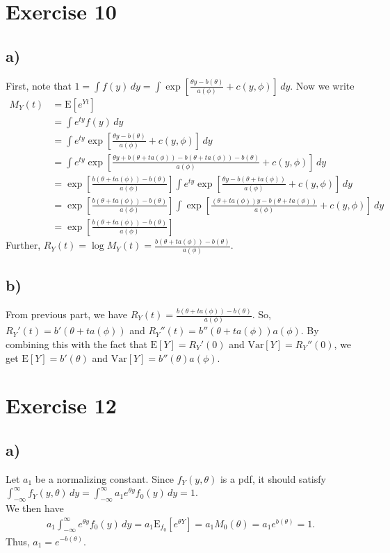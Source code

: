 \documentclass[a4paper]{article}
\newcommand{\E}{\mathrm{E}}
\newcommand{\Var}{\mathrm{Var}}
\begin{document}
\vspace{\baselineskip}
\section{Exercise 10}

\subsection{a)}
First, note that $1 = \int f(y) \,dy = \int\exp\left[\frac{\theta y - b(\theta)}{a(\phi)} + c(y,\phi)\right] \,dy$. Now we write
\begin{align*}
M_{Y}(t) &= \E\left[e^{Yt}\right]\\
&= \int e^{ty} f(y)\,dy\\
&= \int e^{ty} \exp\left[\frac{\theta y - b(\theta)}{a(\phi)} + c(y,\phi)\right] \,dy\\
&= \int e^{ty} \exp\left[\frac{\theta y +b(\theta +ta(\phi)) -b(\theta +ta(\phi)) - b(\theta)}{a(\phi)} + c(y,\phi)\right] \,dy\\
&= \exp\left[ \frac{b(\theta +ta(\phi)) -b(\theta)}{a(\phi)} \right]\int e^{ty} \exp\left[\frac{\theta y -b(\theta +ta(\phi))}{a(\phi)} + c(y,\phi)\right] \,dy\\
&= \exp\left[ \frac{b(\theta +ta(\phi)) -b(\theta)}{a(\phi)} \right]\int \exp\left[\frac{(\theta + ta(\phi))y -b(\theta +ta(\phi))}{a(\phi)} + c(y,\phi)\right] \,dy\\
&= \exp\left[\frac{b(\theta + t a(\phi)) -b(\theta)}{a(\phi)}\right]
\end{align*}
Further, $R_{Y}(t) = \log M_{Y}(t) = \frac{b(\theta + t a(\phi)) -b(\theta)}{a(\phi)}$.\\

\subsection{b)}
From previous part, we have $R_{Y}(t) =\frac{b(\theta + t a(\phi)) -b(\theta)}{a(\phi)}$.
So, $R_{Y}'(t) = b'(\theta + t a(\phi))$ and $R_{Y}''(t) = b''(\theta + t a(\phi)) a(\phi)$. By combining this with the fact that $\E[Y] = R_{Y}'(0)$ and $\Var[Y] = R_{Y}''(0)$, we get $\E[Y] = b'(\theta)$ and  $\Var[Y] = b''(\theta) a(\phi)$.


\vspace{\baselineskip}
\section{Exercise 12}
\subsection{a)}
Let $a_{1}$ be a normalizing constant.
Since $f_{Y}(y,\theta)$ is a pdf, it should satisfy  $\int_{-\infty}^{\infty}f_{Y}(y,\theta) \,dy = \int_{-\infty}^{\infty}a_{1}e^{\theta y}f_{0}(y) \,dy = 1$.\\
We then have
\begin{align*}
a_{1}\int_{-\infty}^{\infty}e^{\theta y}f_{0}(y) \,dy = a_{1}\E_{f_{0}}\left[e^{\theta Y}\right] = a_{1} M_{0}(\theta) = a_{1} e^{b(\theta)} = 1.
\end{align*}
Thus, $a_{1} = e^{-b(\theta)}$.
\end{document}
